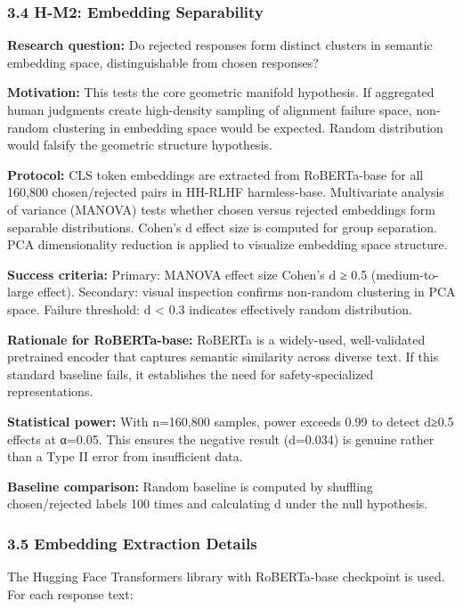 \subsubsection{3.4 H-M2: Embedding Separability}

\textbf{Research question:} Do rejected responses form distinct clusters in semantic embedding space, distinguishable from chosen responses?

\textbf{Motivation:} This tests the core geometric manifold hypothesis. If aggregated human judgments create high-density sampling of alignment failure space, non-random clustering in embedding space would be expected. Random distribution would falsify the geometric structure hypothesis.

\textbf{Protocol:} CLS token embeddings are extracted from RoBERTa-base \citep{Liuetal2019} for all 160,800 chosen/rejected pairs in HH-RLHF harmless-base. Multivariate analysis of variance (MANOVA) tests whether chosen versus rejected embeddings form separable distributions. Cohen's d effect size is computed for group separation. PCA dimensionality reduction is applied to visualize embedding space structure.

\textbf{Success criteria:} Primary: MANOVA effect size Cohen's d ≥ 0.5 (medium-to-large effect). Secondary: visual inspection confirms non-random clustering in PCA space. Failure threshold: d < 0.3 indicates effectively random distribution.

\textbf{Rationale for RoBERTa-base:} RoBERTa is a widely-used, well-validated pretrained encoder that captures semantic similarity across diverse text. If this standard baseline fails, it establishes the need for safety-specialized representations.

\textbf{Statistical power:} With n=160,800 samples, power exceeds 0.99 to detect d≥0.5 effects at α=0.05. This ensures the negative result (d=0.034) is genuine rather than a Type II error from insufficient data.

\textbf{Baseline comparison:} Random baseline is computed by shuffling chosen/rejected labels 100 times and calculating d under the null hypothesis.

\subsubsection{3.5 Embedding Extraction Details}

The Hugging Face Transformers library \citep{Wolfetal2020} with RoBERTa-base checkpoint is used. For each response text:

